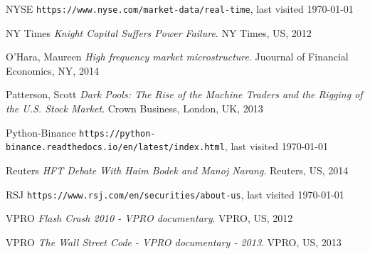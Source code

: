 \documentclass[12pt]{article}
\begin{document}
\begin{thebibliography}{9}
NYSE
\texttt{https://www.nyse.com/market-data/real-time}, last visited \today

NY Times
\textit{Knight Capital Suffers Power Failure}.
NY Times, US, 2012

O'Hara, Maureen 
\textit{High frequency market microstructure}.
Juournal of Financial Economics, NY, 2014

Patterson, Scott
\textit{Dark Pools: The Rise of the Machine Traders and the Rigging of the U.S. Stock Market}.
Crown Business, London, UK, 2013

Python-Binance
\texttt{https://python-binance.readthedocs.io/en/latest/index.html}, last visited \today

Reuters
\textit{HFT Debate With Haim Bodek and Manoj Narang}.
Reuters, US, 2014

RSJ
\texttt{https://www.rsj.com/en/securities/about-us}, last visited \today

VPRO
\textit{Flash Crash 2010 - VPRO documentary}.
VPRO, US, 2012

VPRO
\textit{The Wall Street Code - VPRO documentary - 2013}.
VPRO, US, 2013

\end{thebibliography}
\end{document}
